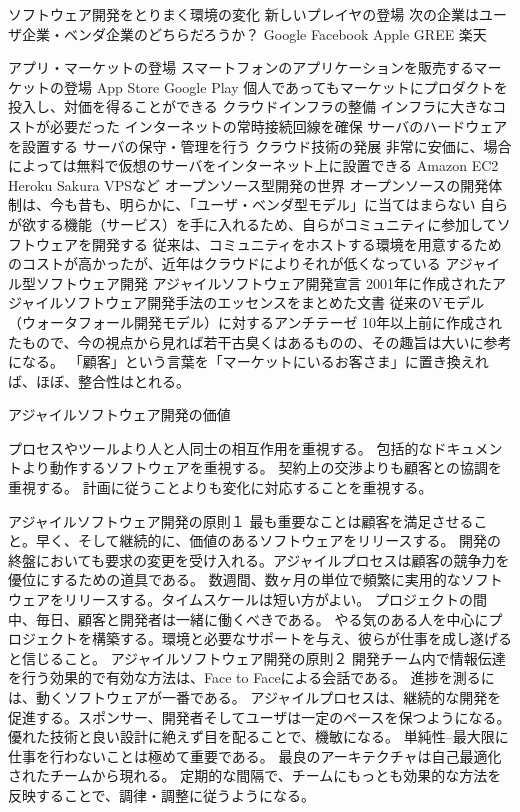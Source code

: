 \documentclass[11pt,a4paper,twoside]{jarticle}
\newcommand{\研究種別}{A}	%
\newcommand{\研究課題名}{コ・クリエイティブなソフトウェア開発者を育成するPBL型教育}
\newcommand{\研究機関名}{産業技術大学院大学}
\newcommand{\研究代表者氏名}{中鉢　欣秀}
\newcommand{\研究代表者氏名ふりがな}{ちゅうばち　よしひで}
\newcommand{\本応募effort}{\KLEffort{18}}	%
\newcommand{\研究期間の最終元号年度}{27}	%
\begin{document}
{ソフトウェア開発をとりまく環境の変化
新しいプレイヤの登場
次の企業はユーザ企業・ベンダ企業のどちらだろうか？
Google
Facebook
Apple
GREE
楽天


アプリ・マーケットの登場
スマートフォンのアプリケーションを販売するマーケットの登場
App Store
Google Play
個人であってもマーケットにプロダクトを投入し、対価を得ることができる
クラウドインフラの整備
インフラに大きなコストが必要だった
インターネットの常時接続回線を確保
サーバのハードウェアを設置する
サーバの保守・管理を行う
クラウド技術の発展
非常に安価に、場合によっては無料で仮想のサーバをインターネット上に設置できる
Amazon EC2
Heroku
Sakura VPSなど
オープンソース型開発の世界
オープンソースの開発体制は、今も昔も、明らかに、「ユーザ・ベンダ型モデル」に当てはまらない
自らが欲する機能（サービス）を手に入れるため、自らがコミュニティに参加してソフトウェアを開発する
従来は、コミュニティをホストする環境を用意するためのコストが高かったが、近年はクラウドによりそれが低くなっている
アジャイル型ソフトウェア開発
アジャイルソフトウェア開発宣言
2001年に作成されたアジャイルソフトウェア開発手法のエッセンスをまとめた文書
従来のVモデル（ウォータフォール開発モデル）に対するアンチテーゼ
10年以上前に作成されたもので、今の視点から見れば若干古臭くはあるものの、その趣旨は大いに参考になる。
「顧客」という言葉を「マーケットにいるお客さま」に置き換えれば、ほぼ、整合性はとれる。

アジャイルソフトウェア開発の価値

プロセスやツールより人と人同士の相互作用を重視する。
包括的なドキュメントより動作するソフトウェアを重視する。
契約上の交渉よりも顧客との協調を重視する。
計画に従うことよりも変化に対応することを重視する。


アジャイルソフトウェア開発の原則１
最も重要なことは顧客を満足させること。早く、そして継続的に、価値のあるソフトウェアをリリースする。
開発の終盤においても要求の変更を受け入れる。アジャイルプロセスは顧客の競争力を優位にするための道具である。
数週間、数ヶ月の単位で頻繁に実用的なソフトウェアをリリースする。タイムスケールは短い方がよい。
プロジェクトの間中、毎日、顧客と開発者は一緒に働くべきである。
やる気のある人を中心にプロジェクトを構築する。環境と必要なサポートを与え、彼らが仕事を成し遂げると信じること。
アジャイルソフトウェア開発の原則２
開発チーム内で情報伝達を行う効果的で有効な方法は、Face to Faceによる会話である。
進捗を測るには、動くソフトウェアが一番である。
アジャイルプロセスは、継続的な開発を促進する。スポンサー、開発者そしてユーザは一定のペースを保つようになる。
優れた技術と良い設計に絶えず目を配ることで、機敏になる。
単純性--最大限に仕事を行わないことは極めて重要である。
最良のアーキテクチャは自己最適化されたチームから現れる。
定期的な間隔で、チームにもっとも効果的な方法を反映することで、調律・調整に従うようになる。

}
\end{document}
